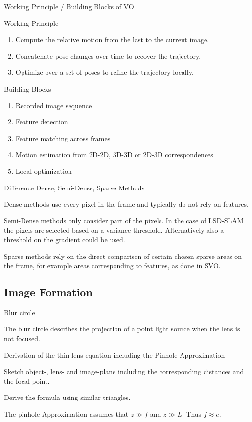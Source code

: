 \documentclass[10pt,a4paper]{scrartcl}
\begin{document}
\begin{multicols*}{2}
\begin{QandA}{Working Principle / Building Blocks of VO}
\item Working Principle
\begin{enumerate}
\item Compute the relative motion from the last to the current image.
\item Concatenate pose changes over time to recover the trajectory.
\item Optimize over a set of poses to refine the trajectory locally.
\end{enumerate}
\item Building Blocks
\begin{enumerate}
\item Recorded image sequence
\item Feature detection
\item Feature matching across frames
\item Motion estimation from 2D-2D, 3D-3D or 2D-3D correspondences
\item Local optimization
\end{enumerate}
\end{QandA}

\begin{QandA}{Difference Dense, Semi-Dense, Sparse Methods}
\item Dense methods use every pixel in the frame and typically do not rely on features.
\item Semi-Dense methods only consider part of the pixels. In the case of LSD-SLAM the pixels are selected based on a variance threshold. Alternatively also a threshold on the gradient could be used.
\item Sparse methods rely on the direct comparison of certain chosen sparse areas on the frame, for example areas corresponding to features, as done in SVO.
\end{QandA}

\subsection*{Image Formation}

\begin{QandA}{Blur circle}
\item The blur circle describes the projection of a point light source when the lens is not focused.
\end{QandA}

\begin{QandA}{Derivation of the thin lens equation including the Pinhole Approximation}
\item Sketch object-, lens- and image-plane including the corresponding distances and the focal point.
\item Derive the formula using similar triangles.
\item The pinhole Approximation assumes that $z\gg f$ and $z\gg L$. Thus $f\approx e$. 
\end{QandA}


\end{multicols*}
\end{document}
